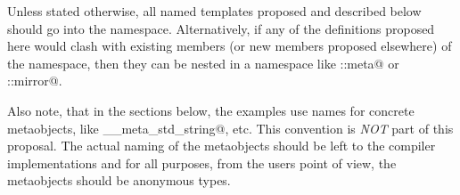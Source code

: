 Unless stated otherwise, all named templates proposed and described below should
go into the \verb@std@ namespace. Alternatively, if any of the definitions
proposed here would clash with existing members (or new members proposed elsewhere)
of the \verb@std@ namespace, then they can be nested in a namespace like
\verb@std::meta@ or \verb@std::mirror@.

Also note, that in the sections below, the examples use names for concrete
metaobjects, like \verb@__meta_std_string@, etc. This convention
is {\em NOT} part of this proposal. The actual naming of the metaobjects
should be left to the compiler implementations and for all purposes,
from the users point of view, the metaobjects should be anonymous types.



















